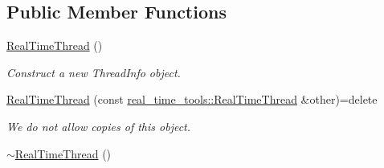 \subsection*{Public Member Functions}
\begin{DoxyCompactItemize}
\item 
\hyperlink{classreal__time__tools_1_1RealTimeThread_aca6224b9cbe75e3a85b281e0de096b64}{Real\+Time\+Thread} ()\hypertarget{classreal__time__tools_1_1RealTimeThread_aca6224b9cbe75e3a85b281e0de096b64}{}\label{classreal__time__tools_1_1RealTimeThread_aca6224b9cbe75e3a85b281e0de096b64}

\begin{DoxyCompactList}\small\item\em Construct a new Thread\+Info object. \end{DoxyCompactList}\item 
\hyperlink{classreal__time__tools_1_1RealTimeThread_a5d2cba4b8f65bdbf36edc0bcc589e45e}{Real\+Time\+Thread} (const \hyperlink{classreal__time__tools_1_1RealTimeThread}{real\+\_\+time\+\_\+tools\+::\+Real\+Time\+Thread} \&other)=delete\hypertarget{classreal__time__tools_1_1RealTimeThread_a5d2cba4b8f65bdbf36edc0bcc589e45e}{}\label{classreal__time__tools_1_1RealTimeThread_a5d2cba4b8f65bdbf36edc0bcc589e45e}

\begin{DoxyCompactList}\small\item\em We do not allow copies of this object. \end{DoxyCompactList}\item 
\hyperlink{classreal__time__tools_1_1RealTimeThread_a8e94b07c6ff51d50b1861887fbd1f69f}{$\sim$\+Real\+Time\+Thread} ()\hypertarget{classreal__time__tools_1_1RealTimeThread_a8e94b07c6ff51d50b1861887fbd1f69f}{}\label{classreal__time__tools_1_1RealTimeThread_a8e94b07c6ff51d50b1861887fbd1f69f}


\end{DoxyCompactItemize}
